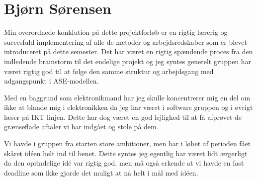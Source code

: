 \section{Bjørn Sørensen}
Min overordnede konklution på dette projektforløb er en rigtig lærerig og succesfuld implementering af alle de metoder og arbejdsredskaber som er blevet introduceret på dette semester. Det har været en rigtig spændende proces fra den indledende brainstorm til det endelige projekt og jeg syntes generelt gruppen har været rigtig god til at følge den samme struktur og arbejdsgang med udgangspunkt i ASE-modellen.

Med en baggrund som elektronikmand har jeg skulle koncentrerer mig en del om ikke at blande mig i elektronikken da jeg har været i software gruppen og i øvrigt læser på IKT linjen. Dette har dog været en god lejlighed til at få afprøvet de grænseflade aftaler vi har indgået og stole på dem.

Vi havde i gruppen fra starten store ambitioner, men har i løbet af perioden fået skåret idéen helt ind til benet. Dette syntes jeg egentlig har været lidt ærgerligt da den oprindelige idé var rigtig god, men må også erkende at vi havde en fast deadline som ikke gjorde det muligt at nå helt i mål med idéen.